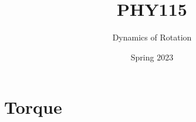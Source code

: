 \documentclass[]{beamer}
\title{PHY115}    %
\author{Dynamics of Rotation}                 %
\institute{Digipen}      %
\date{Spring 2023}
\begin{document}
\begin{frame}
  \titlepage
\end{frame}

\section[]{}

\begin{frame}
  \tableofcontents
\end{frame}

\section{Torque}
\end{document}
